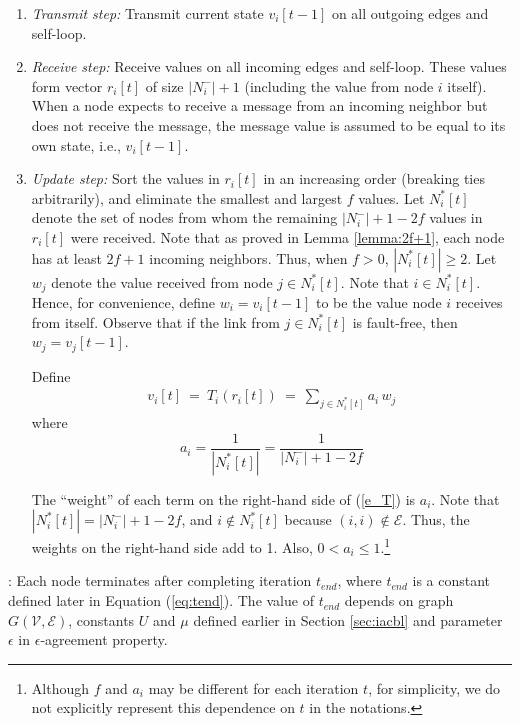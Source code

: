\documentclass{llncs}
\newcommand{\scripte}{\mathcal{E}}
\newcommand{\scriptv}{\mathcal{V}}
\begin{document}
\begin{enumerate}

\item {\em Transmit step:} Transmit current state $v_i[t-1]$ on all outgoing edges and self-loop.

\item {\em Receive step:} Receive values on all incoming edges and self-loop. These values form vector $r_i[t]$ of size $|N_i^-|+1$ (including the value from node $i$ itself). When a node expects to receive a message from an incoming neighbor but does not receive the message, the message value is assumed to be equal to its own state, i.e., $v_i[t-1]$.

\item {\em Update step:}
Sort the values in $r_i[t]$ in an increasing order (breaking ties arbitrarily), and eliminate the smallest and largest $f$ values. 
Let $N_i^*[t]$ denote the set of nodes from whom the remaining $|N_i^-| +1 - 2f$ values in $r_i[t]$ were received. Note that as proved in Lemma \ref{lemma:2f+1}, each node has at least $2f+1$ incoming neighbors. Thus, when $f > 0$, $|N_i^*[t]| \geq 2$.
Let $w_j$ denote the value received from node $j \in N_i^*[t]$. Note that $i \in N_i^*[t]$. Hence, for convenience, define $w_i=v_i[t-1]$ to be the value node $i$ receives from itself.  Observe that
if the link from $j\in N_i^*[t]$ is fault-free, then $w_j=v_j[t-1]$.

Define
\begin{eqnarray}
v_i[t] ~ = ~ T_i(r_i[t]) ~ = ~\sum_{j\in N_i^*[t]} a_i \, w_j
\label{e_T}
\end{eqnarray}
where
\[ a_i = \frac{1}{|N_i^*[t]|} = \frac{1}{|N_i^-|+1-2f}
\] 

The ``weight'' of each term on the right-hand side of
(\ref{e_T}) is $a_i$. Note that $|N_i^*[t]| = |N_i^-|+1 - 2f$, and $i\not\in N_i^*[t]$ because $(i,i)\not\in\scripte$. Thus, the weights on the right-hand side add to 1. Also, $0<a_i\leq 1$.\footnote{Although $f$ and $a_i$ may be different for each iteration $t$, for simplicity, we do not explicitly represent this dependence on $t$ in the notations.} 




\end{enumerate}

: Each node terminates after completing iteration $t_{end}$, where $t_{end}$ is a constant defined later in Equation (\ref{eq:tend}). The value of $t_{end}$ depends on graph $G(\scriptv, \scripte)$, constants $U$ and $\mu$ defined earlier in Section \ref{sec:iacbl} and parameter $\epsilon$ in $\epsilon$-agreement property.
\end{document}
